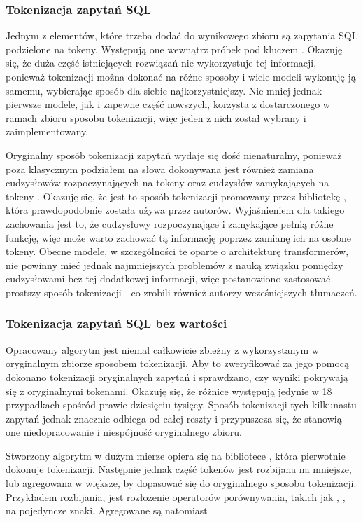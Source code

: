 \subsubsection{Tokenizacja zapytań SQL}
Jednym z elementów, które trzeba dodać do wynikowego zbioru są zapytania SQL podzielone na tokeny. Występują one wewnątrz próbek pod kluczem . Okazuję się, że duża część istniejących rozwiązań nie wykorzystuje tej informacji, ponieważ tokenizacji można dokonać na różne sposoby i wiele modeli wykonuję ją samemu, wybierając sposób dla siebie najkorzystniejszy. Nie mniej jednak pierwsze modele, jak i zapewne część nowszych, korzysta z dostarczonego w ramach zbioru sposobu tokenizacji, więc jeden z nich został wybrany i zaimplementowany.

Oryginalny sposób tokenizacji zapytań wydaje się dość nienaturalny, ponieważ poza klasycznym podziałem na słowa dokonywana jest również zamiana cudzysłowów rozpoczynających na tokeny  oraz cudzysłów zamykających na tokeny . Okazuję się, że jest to sposób tokenizacji promowany przez bibliotekę , która prawdopodobnie została używa przez autorów. Wyjaśnieniem dla takiego zachowania jest to, że cudzysłowy rozpoczynające i zamykające pełnią różne funkcję, więc może warto zachować tą informację poprzez zamianę ich na osobne tokeny. Obecne modele, w szczególności te oparte o architekturę transformerów, nie powinny mieć jednak najmniejszych problemów z nauką związku pomiędzy cudzysłowami bez tej dodatkowej informacji, więc postanowiono zastosować prostszy sposób tokenizacji - co zrobili również autorzy wcześniejszych tłumaczeń.

\subsubsection{Tokenizacja zapytań SQL bez wartości}


Opracowany algorytm jest niemal całkowicie zbieżny z wykorzystanym w oryginalnym zbiorze  sposobem tokenizacji. Aby to zweryfikować za jego pomocą dokonano tokenizacji oryginalnych zapytań i sprawdzano, czy wyniki pokrywają się z oryginalnymi tokenami. Okazuję się, że różnice występują jedynie w 18 przypadkach spośród prawie dziesięciu tysięcy. Sposób tokenizacji tych kilkunastu zapytań jednak znacznie odbiega od całej reszty i przypuszcza się, że stanowią one niedopracowanie i niespójność oryginalnego zbioru.

Stworzony algorytm w dużym mierze opiera się na bibliotece , która pierwotnie dokonuje tokenizacji. Następnie jednak część tokenów jest rozbijana na mniejsze, lub agregowana w większe, by dopasować się do oryginalnego sposobu tokenizacji. Przykładem rozbijania, jest rozłożenie operatorów porównywania, takich jak \sql{!=}, \sql{>=}, \sql{<=} na pojedyncze znaki. Agregowane są natomiast

